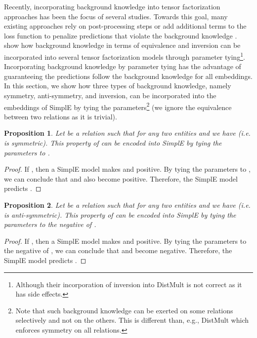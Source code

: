 \documentclass{article}
\newtheorem{proposition}{Proposition}
\begin{document}
Recently, incorporating background knowledge into tensor factorization approaches has been the focus of several studies. Towards this goal, many existing approaches rely on post-processing steps or add additional terms to the loss function to penalize predictions that violate the background knowledge \cite{rocktaschel2014low,wang2015knowledge,wei2015large,guo2016jointly,ding2018improving}.  \citet{minervini2017regularizing} show how background knowledge in terms of equivalence and inversion can be incorporated into several tensor factorization models through parameter tying\footnote{Although their incorporation of inversion into DistMult is not correct as it has side effects.}. Incorporating background knowledge by parameter tying has the advantage of guaranteeing the predictions follow the background knowledge for all embeddings.
In this section, we show how three types of background knowledge, namely symmetry, anti-symmetry, and inversion, can be incorporated into the embeddings of SimplE by tying the parameters\footnote{Note that such background knowledge can be exerted on some relations selectively and not on the others. This is different than, e.g., DistMult which enforces symmetry on all relations.} (we ignore the equivalence between two relations as it is trivial).

\begin{proposition} \label{expert-prop1}
Let  be a relation such that for any two entities  and  we have  (i.e.  is symmetric). This property of  can be encoded into SimplE by tying the parameters  to .
\end{proposition}

\begin{proof}
If , then a SimplE model makes  and  positive. By tying the parameters  to , we can conclude that  and  also become positive. Therefore, the SimplE model predicts .
\end{proof}

\begin{proposition} \label{expert-prop2}
Let  be a relation such that for any two entities  and  we have  (i.e.  is anti-symmetric). This property of  can be encoded into SimplE by tying the parameters  to the negative of .
\end{proposition}

\begin{proof}
If , then a SimplE model makes  and  positive. By tying the parameters  to the negative of , we can conclude that  and  become negative. Therefore, the SimplE model predicts .
\end{proof}
\end{document}

